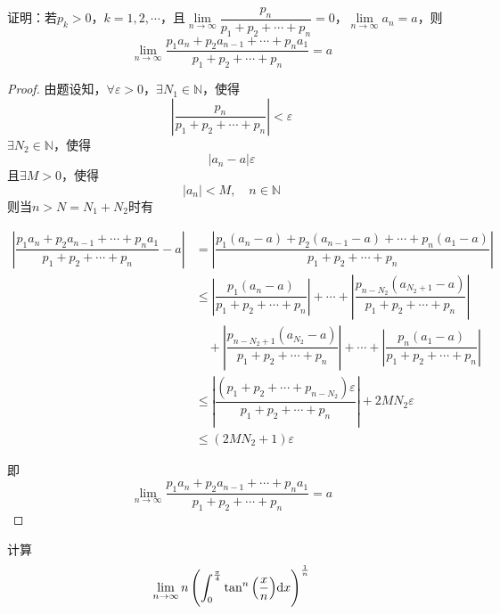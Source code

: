 \begin{proposition}
    
    证明：若$p_k > 0$，$k = 1, 2, \cdots$，且$\lim\limits_{n\to \infty}{\dfrac{p_n}{p_1 + p_2 + \cdots + p_n}} = 0$，$\lim\limits_{n \to \infty}{a_n} = a$，则
    \[\lim\limits_{n \to \infty}{\dfrac{p_1 a_n + p_2 a_{n - 1} + \cdots + p_n a_1}{p_1 + p_2 + \cdots + p_n}} = a\]

\end{proposition}

\begin{proof}

    由题设知，$\forall \varepsilon > 0$，$\exists N_1 \in \mathbb{N}$，使得
    \[\left| \dfrac{p_n}{p_1 + p_2 + \cdots + p_n} \right| < \varepsilon\]
    $\exists N_2 \in \mathbb{N}$，使得
    \[|a_n - a| \varepsilon\]
    且$\exists M > 0$，使得
    \[|a_n| < M, \quad n \in \mathbb{N}\]
    则当$n > N = N_1 + N_2$时有

    \begin{align*}
        \left| \dfrac{p_1 a_n + p_2 a_{n - 1} + \cdots + p_n a_1}{p_1 + p_2 + \cdots + p_n} - a \right| & = \left| \dfrac{p_1 (a_n - a) + p_2 (a_{n - 1} - a) + \cdots + p_n (a_1 - a)}{p_1 + p_2 + \cdots + p_n} \right| \\
        & \leq \left| \dfrac{p_1 (a_n - a)}{p_1 + p_2 + \cdots + p_n} \right| + \cdots + \left| \dfrac{p_{n - N_2} (a_{N_2 + 1} - a)}{p_1 + p_2 + \cdots + p_n} \right| \\
        & \quad + \left| \dfrac{p_{n - N_2 + 1} (a_{N_2} - a)}{p_1 + p_2 + \cdots + p_n} \right| + \cdots + \left| \dfrac{p_n (a_1 - a)}{p_1 + p_2 + \cdots + p_n} \right| \\
        & \leq \left| \dfrac{(p_1 + p_2 + \cdots + p_{n - N_2})\varepsilon}{p_1 + p_2 + \cdots + p_n} \right| + 2M N_2 \varepsilon \\
        & \leq (2M N_2 + 1) \varepsilon
    \end{align*}

    即
    \[\lim\limits_{n \to \infty}{\dfrac{p_1 a_n + p_2 a_{n - 1} + \cdots + p_n a_1}{p_1 + p_2 + \cdots + p_n}} = a\]
    
\end{proof}

\begin{proposition}

    计算
    \[\lim\limits_{n \to \infty}{n \left( \int_{0}^{\frac{\pi}{4}}{\tan^n{\left( \dfrac{x}{n} \right)}}\mathrm{d} x \right)^{\frac{1}{n}}}\]

\end{proposition}


